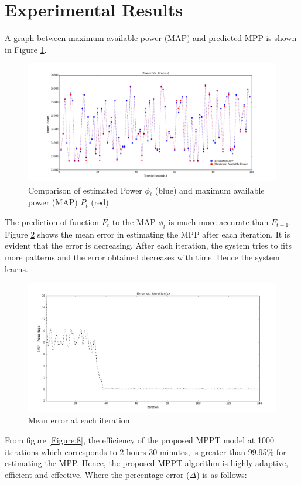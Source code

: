 \section{Experimental Results}
A graph between maximum available power (MAP) and predicted MPP is shown in Figure \ref{Figure:6}.
\begin{center}
\begin{figure}
\includegraphics[width=12cm,keepaspectratio]{6.png}
\caption{Comparison of estimated Power $\phi_t$ (blue) and maximum available power (MAP) $P_t$ (red)}
\label{Figure:6}    
\end{figure}
\end{center}
The prediction of function $F_t$  to the MAP $\phi_t$ is much more accurate than $ F_{t-1}$. Figure \ref{Figure:7} shows the mean error in estimating the MPP after each iteration. It is evident that the error is decreasing. After each iteration, the system tries to fits more patterns and the error obtained decreases with time. Hence the system learns.
\begin{center}
\begin{figure}
\includegraphics[width=12cm,keepaspectratio]{error.png}
\caption{Mean error at each iteration}
\label{Figure:7}    
\end{figure}
\end{center}
From figure \ref{Figure:8}, the  efficiency of the proposed MPPT model at 1000 iterations which corresponds to $2$ hours $30$ minutes, is greater than 99.95\% for estimating the MPP. Hence, the proposed MPPT algorithm is highly adaptive, efficient and effective. Where the percentage error ($\Delta$) is as follows: 
